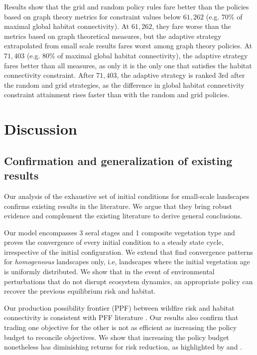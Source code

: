 Results show that the grid and random policy rules  fare better than the policies based on graph theory metrics for constraint values below $61,262$ (e.g. 70\% of maximal global habitat connectivity). At $61,262$, they fare worse than the metrics based on graph theoretical measures, but the adaptive strategy extrapolated from small scale results fares worst among graph theory policies. At $71,403$ (e.g. 80\% of maximal global habitat connectivity), the adaptive strategy fares better than all measures, as only it is the only one that satisfies the habitat connectivity constraint. After $71,403$, the adaptive strategy is ranked 3rd after the random and grid strategies, as the difference in global habitat connectivity constraint attainment rises faster than with the random and grid policies.

\section{Discussion}
\label{section:discussion}

\subsection{Confirmation and generalization of existing results}
Our analysis of the exhaustive set of initial conditions for small-scale landscapes confirms existing results in the literature. We argue that they bring robust evidence and complement the existing literature to derive general conclusions. 

Our model encompasses 3 seral stages and 1 composite vegetation type and proves the convergence of every initial condition to a steady state cycle, irrespective of the initial configuration. We extend \cite{minas_spatial_2014} that find convergence patterns for \textit{homogeneous} landscapes only, i.e, landscapes where the initial vegetation age is uniformly distributed.  We show that in the event of environmental perturbations that do not disrupt ecosystem dynamics, an appropriate policy can recover the previous equilibrium risk and habitat. 

Our production possibility frontier (PPF) between wildfire risk and habitat connectivity is consistent with PFF literature \citep{arthaud_methodology_1996,calkin_modeling_2005}. Our results also confirm that trading one objective for the other is not as efficient as increasing the policy budget to reconcile objectives. We show that increasing the policy budget nonetheless has diminishing returns for risk reduction, as highlighted by \cite{wei_optimization_2008, yemshanov_detecting_2021} and \cite{pais_cell2fire_2021}. 

